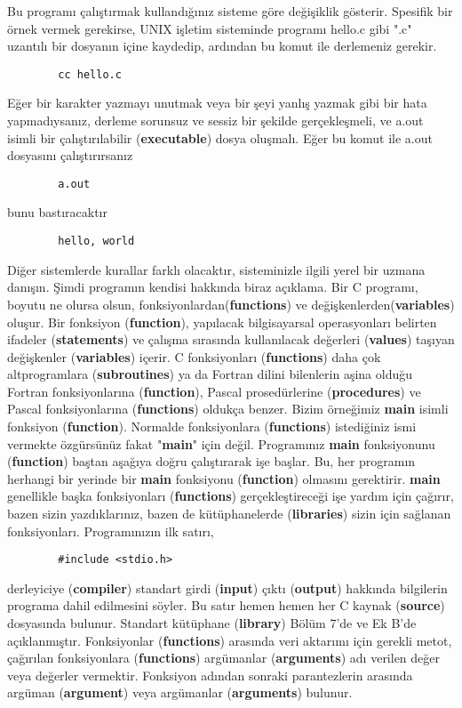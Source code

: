 \documentclass[a4paper,12pt,oneside]{book}
\begin{document}
Bu programı çalıştırmak kullandığınız sisteme göre değişiklik gösterir. Spesifik bir örnek vermek gerekirse, UNIX işletim sisteminde programı hello.c gibi ".c" uzantılı bir dosyanın içine kaydedip, ardından bu komut ile derlemeniz gerekir.
\begin{lstlisting}
		cc hello.c
\end{lstlisting}
Eğer bir karakter yazmayı unutmak veya bir şeyi yanlış yazmak gibi bir hata yapmadıysanız, derleme sorunsuz ve sessiz bir şekilde gerçekleşmeli, ve a.out isimli bir çalıştırılabilir (\textbf{executable}) dosya oluşmalı. Eğer bu komut ile a.out dosyasını çalıştırırsanız
\begin{lstlisting}
		a.out
\end{lstlisting}
bunu bastıracaktır
\begin{lstlisting}
		hello, world
\end{lstlisting}

Diğer sistemlerde kurallar farklı olacaktır, sisteminizle ilgili yerel bir uzmana danışın.
Şimdi programın kendisi hakkında biraz açıklama. Bir C programı, boyutu ne olursa olsun, fonksiyonlardan(\textbf{functions}) ve değişkenlerden(\textbf{variables}) oluşur. Bir fonksiyon (\textbf{function}), yapılacak bilgisayarsal operasyonları belirten ifadeler (\textbf{statements}) ve çalışma sırasında kullanılacak değerleri (\textbf{values}) taşıyan değişkenler (\textbf{variables}) içerir. C fonksiyonları (\textbf{functions}) daha çok altprogramlara (\textbf{subroutines}) ya da Fortran dilini bilenlerin aşina olduğu Fortran fonksiyonlarına (\textbf{function}), Pascal prosedürlerine (\textbf{procedures}) ve Pascal fonksiyonlarına (\textbf{functions}) oldukça benzer. Bizim örneğimiz \textbf{main} isimli fonksiyon (\textbf{function}). Normalde fonksiyonlara (\textbf{functions}) istediğiniz ismi vermekte özgürsünüz fakat "\textbf{main}" için değil. Programınız \textbf{main} fonksiyonunu (\textbf{function}) baştan aşağıya doğru çalıştırarak işe başlar. Bu, her programın herhangi bir yerinde bir \textbf{main} fonksiyonu (\textbf{function}) olmasını gerektirir.
\textbf{main} genellikle başka fonksiyonları (\textbf{functions}) gerçekleştireceği işe yardım için çağırır, bazen sizin yazdıklarınız, bazen de kütüphanelerde (\textbf{libraries}) sizin için sağlanan fonksiyonları. Programınızın ilk satırı,
\begin{lstlisting}
		#include <stdio.h>
\end{lstlisting}
derleyiciye (\textbf{compiler}) standart girdi (\textbf{input}) çıktı (\textbf{output}) hakkında bilgilerin programa dahil edilmesini söyler. Bu satır hemen hemen her C kaynak (\textbf{source}) dosyasında bulunur. Standart kütüphane (\textbf{library}) Bölüm 7'de ve Ek B'de açıklanmıştır.
Fonksiyonlar (\textbf{functions}) arasında veri aktarımı için gerekli metot, çağırılan fonksiyonlara (\textbf{functions}) argümanlar (\textbf{arguments}) adı verilen değer veya değerler vermektir. Fonksiyon adından sonraki parantezlerin arasında argüman (\textbf{argument}) veya argümanlar (\textbf{arguments}) bulunur. \\
\end{document}
